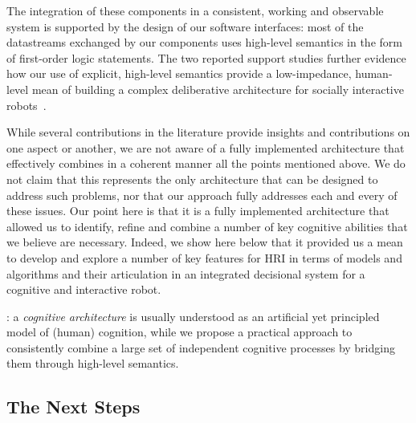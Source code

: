 \documentclass[preprint,3p,times]{elsarticle}
\begin{document}
The integration of these components in a consistent, working and observable
system is supported by the design of our software interfaces: most of the
datastreams exchanged by our components uses high-level semantics in the form of
first-order logic statements. The two reported support studies further evidence
how our use of explicit, high-level semantics provide a low-impedance,
human-level mean of building a complex deliberative
architecture for socially interactive robots~\cite{Lemaignan2013}.




While several contributions in the literature provide insights and contributions 
on one aspect or another, we are not aware of a fully implemented architecture that effectively
combines in a coherent manner all the points mentioned above.
We do not claim that this represents the only architecture that can be designed
to address such problems, nor that our approach fully addresses each and every
of these issues. Our point here is that it is a fully implemented architecture that allowed us to
identify, refine and combine a number of key cognitive abilities that we believe are necessary. Indeed, 
we show here below that it provided us a mean to develop and explore a number of key features for HRI 
in terms of models and algorithms and their articulation in an integrated decisional system for a 
cognitive and interactive robot.



: a \emph{cognitive
architecture} is usually understood as an artificial yet principled model of (human)
cognition, while we propose a practical approach to consistently combine a large
set of independent cognitive processes by bridging them through high-level semantics.

\subsection{The Next Steps}

\end{document}
